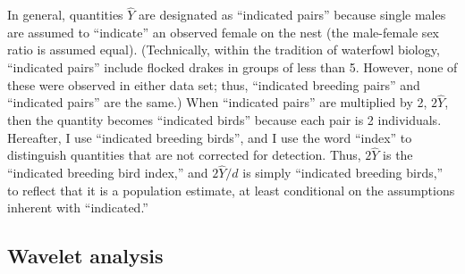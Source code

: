 \documentclass[
  10pt,
  letterpaper,
]{article}
\begin{document}
In general, quantities \(\hat Y\) are designated as ``indicated pairs''
because single males are assumed to ``indicate'' an observed female on
the nest (the male-female sex ratio is assumed equal). (Technically,
within the tradition of waterfowl biology, ``indicated pairs'' include
flocked drakes in groups of less than 5. However, none of these were
observed in either data set; thus, ``indicated breeding pairs'' and
``indicated pairs'' are the same.) When ``indicated pairs'' are
multiplied by 2, \(2\hat Y\), then the quantity becomes ``indicated
birds'' because each pair is 2 individuals. Hereafter, I use ``indicated
breeding birds'', and I use the word ``index'' to distinguish quantities
that are not corrected for detection. Thus, \(2\hat Y\) is the
``indicated breeding bird index,'' and \(2\hat Y/d\) is simply
``indicated breeding birds,'' to reflect that it is a population
estimate, at least conditional on the assumptions inherent with
``indicated.''

\subsection{Wavelet analysis}\label{wavelet-analysis}
\end{document}
